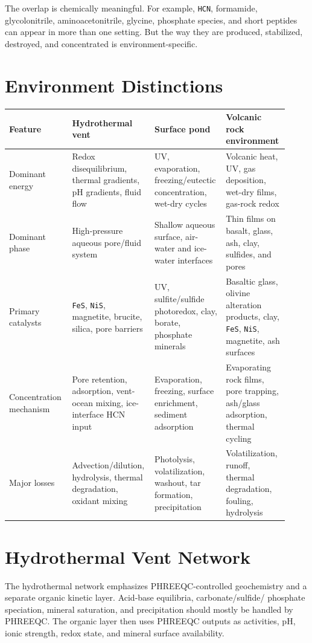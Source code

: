 \documentclass[11pt]{article}
\newcommand{\ch}[1]{\mbox{\texttt{#1}}}
\begin{document}
The overlap is chemically meaningful.  For example, \ch{HCN}, formamide,
glycolonitrile, aminoacetonitrile, glycine, phosphate species, and short
peptides can appear in more than one setting.  But the way they are produced,
stabilized, destroyed, and concentrated is environment-specific.

\section{Environment Distinctions}

\begin{longtable}{p{0.22\linewidth}p{0.24\linewidth}p{0.24\linewidth}p{0.22\linewidth}}
\toprule
Feature & Hydrothermal vent & Surface pond & Volcanic rock environment \\
\midrule
Dominant energy &
Redox disequilibrium, thermal gradients, pH gradients, fluid flow &
UV, evaporation, freezing/eutectic concentration, wet-dry cycles &
Volcanic heat, UV, gas deposition, wet-dry films, gas-rock redox \\
Dominant phase &
High-pressure aqueous pore/fluid system &
Shallow aqueous surface, air-water and ice-water interfaces &
Thin films on basalt, glass, ash, clay, sulfides, and pores \\
Primary catalysts &
\ch{FeS}, \ch{NiS}, magnetite, brucite, silica, pore barriers &
UV, sulfite/sulfide photoredox, clay, borate, phosphate minerals &
Basaltic glass, olivine alteration products, clay, \ch{FeS}, \ch{NiS},
magnetite, ash surfaces \\
Concentration mechanism &
Pore retention, adsorption, vent-ocean mixing, ice-interface HCN input &
Evaporation, freezing, surface enrichment, sediment adsorption &
Evaporating rock films, pore trapping, ash/glass adsorption, thermal cycling \\
Major losses &
Advection/dilution, hydrolysis, thermal degradation, oxidant mixing &
Photolysis, volatilization, washout, tar formation, precipitation &
Volatilization, runoff, thermal degradation, fouling, hydrolysis \\
\bottomrule
\end{longtable}

\section{Hydrothermal Vent Network}

The hydrothermal network emphasizes PHREEQC-controlled geochemistry and a
separate organic kinetic layer.  Acid-base equilibria, carbonate/sulfide/
phosphate speciation, mineral saturation, and precipitation should mostly be
handled by PHREEQC.  The organic layer then uses PHREEQC outputs as activities,
pH, ionic strength, redox state, and mineral surface availability.
\end{document}

